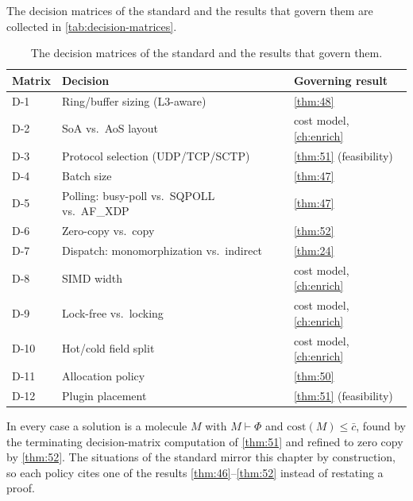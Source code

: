 The decision matrices of the standard and the results that govern them are collected in \autoref{tab:decision-matrices}.

\begin{table}[h]
\centering
\small
\begin{tabular}{@{}lll@{}}
\toprule
Matrix & Decision & Governing result \\
\midrule
D-1  & Ring/buffer sizing (L3-aware)        & \autoref{thm:48} \\
D-2  & SoA vs.\ AoS layout                  & cost model, \autoref{ch:enrich} \\
D-3  & Protocol selection (UDP/TCP/SCTP)    & \autoref{thm:51} (feasibility) \\
D-4  & Batch size                           & \autoref{thm:47} \\
D-5  & Polling: busy-poll vs.\ SQPOLL vs.\ AF\_XDP & \autoref{thm:47} \\
D-6  & Zero-copy vs.\ copy                  & \autoref{thm:52} \\
D-7  & Dispatch: monomorphization vs.\ indirect & \autoref{thm:24} \\
D-8  & SIMD width                           & cost model, \autoref{ch:enrich} \\
D-9  & Lock-free vs.\ locking               & cost model, \autoref{ch:enrich} \\
D-10 & Hot/cold field split                 & cost model, \autoref{ch:enrich} \\
D-11 & Allocation policy                    & \autoref{thm:50} \\
D-12 & Plugin placement                     & \autoref{thm:51} (feasibility) \\
\bottomrule
\end{tabular}
\caption{The decision matrices of the standard and the results that govern them.}
\label{tab:decision-matrices}
\end{table}

In every case a solution is a molecule $M$ with $M \vdash \Phi$ and $\mathrm{cost} (M) \leq \bar c$, found by the terminating decision-matrix computation of \autoref{thm:51} and refined to zero copy by \autoref{thm:52}. The situations of the standard mirror this chapter by construction, so each policy cites one of the results \autoref{thm:46}--\autoref{thm:52} instead of restating a proof.
